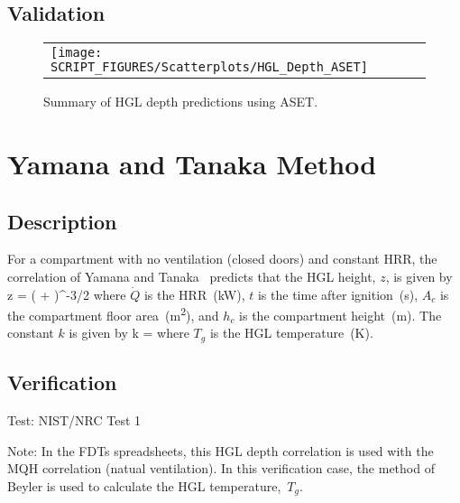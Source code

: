 \subsection*{Validation}

\begin{figure}[!ht]
\begin{center}
\begin{tabular}{l}
\texttt{[image: SCRIPT\_FIGURES/Scatterplots/HGL\_Depth\_ASET]}
\end{tabular}
\end{center}
\caption[Summary of HGL depth predictions using ASET]
{Summary of HGL depth predictions using ASET.}
\label{HGL_Depth_ASET}
\end{figure}


\clearpage


\section{Yamana and Tanaka Method}

\subsection*{Description}

For a compartment with no ventilation (closed doors) and constant HRR, the correlation of Yamana and Tanaka~\cite{Tanaka:1} predicts that the HGL height, $z$, is given by
\be
z = \left(  +  \right)^{-3/2}
\label{eq:Yamana_Tanaka}
\ee
where $\dot Q$ is the HRR~(\si{kW}), $t$ is the time after ignition~(\si{s}), $A_c$ is the compartment floor area~(\si{m^2}), and $h_c$ is the compartment height~(\si{m}). The constant $k$ is given by
\be
k = 
\ee
where $T_g$ is the HGL temperature~(\si{K}).

\subsection*{Verification}

Test: NIST/NRC Test 1

\noindent Note: In the FDTs spreadsheets, this HGL depth correlation is used with the MQH correlation (natual ventilation). In this verification case, the method of Beyler is used to calculate the HGL temperature,~$T_g$.

